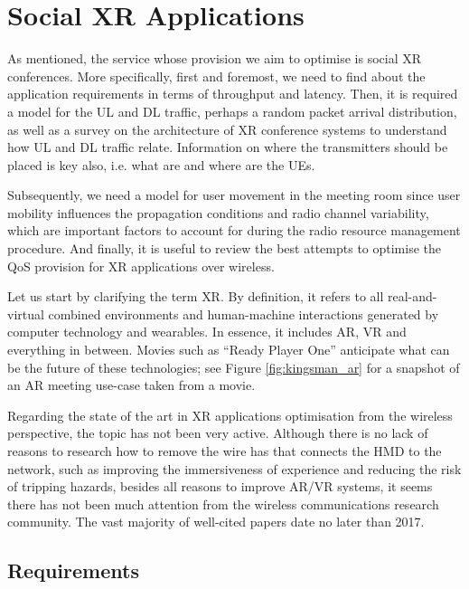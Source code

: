 \section{Social XR Applications}
\label{sec:sxr_applications}

As mentioned, the service whose provision we aim to optimise is social XR conferences. More specifically, first and foremost, we need to find about the application requirements in terms of throughput and latency. Then, it is required a model for the \ac{UL} and \ac{DL} traffic, perhaps a random packet arrival distribution, as well as a survey on the architecture of XR conference systems to understand how \ac{UL} and \ac{DL} traffic relate. Information on where the transmitters should be placed is key also, i.e. what are and where are the \acp{UE}.

Subsequently, we need a model for user movement in the meeting room since user mobility influences the propagation conditions and radio channel variability, which are important factors to account for during the radio resource management procedure. And finally, it is useful to review the best attempts to optimise the \ac{QoS} provision for XR applications over wireless.

Let us start by clarifying the term \ac{XR}. By definition, it refers to all real-and-virtual combined environments and human-machine interactions generated by computer technology and wearables. In essence, it includes \ac{AR}, \ac{VR} and everything in between. Movies such as ``Ready Player One'' \cite{readyPlayerOne} anticipate what can be the future of these technologies; see Figure \ref{fig:kingsman_ar} for a snapshot of an AR meeting use-case taken from a movie.



Regarding the state of the art in XR applications optimisation from the wireless perspective, the topic has not been very active. Although there is no lack of reasons to research how to remove the wire has that connects the \ac{HMD} to the network, such as improving the immersiveness of experience and reducing the risk of tripping hazards, besides all reasons to improve \ac{AR}/\ac{VR} systems, it seems there has not been much attention from the wireless communications research community. The vast majority of well-cited papers date no later than 2017.

\subsection*{Requirements}

